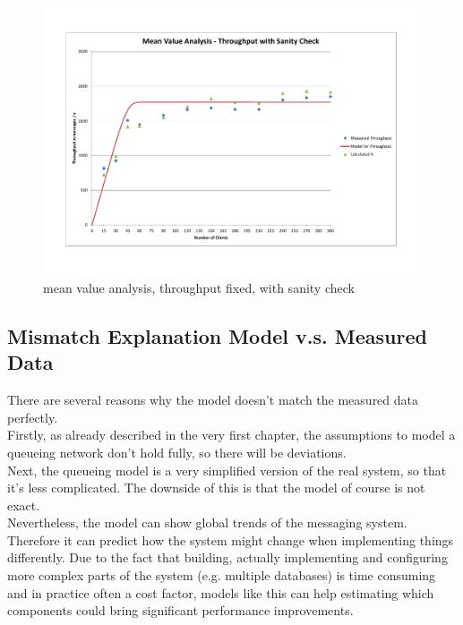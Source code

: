 \documentclass[a4paper]{article}
\begin{document}
{\begin{landscape}\begin{figure}[H]
	\begin{center}
    \includegraphics[scale=0.7, trim = 23mm 28mm 24mm 25mm, clip]{measurements_increase_load/tp_sanity_check_total_fixed.pdf}
  \end{center}
  \caption{mean value analysis, throughput fixed, with sanity check}
  \label{fig:tp-sanity-check-total-fixed}
\end{figure}

\end{landscape}


\subsection{Mismatch Explanation Model v.s. Measured Data}

There are several reasons why the model doesn't match the measured data perfectly.\\

Firstly, as already described in the very first chapter, the assumptions to model a queueing network don't hold fully, so there will be deviations.\\

Next, the queueing model is a very simplified version of the real system, so that it's less complicated. The downside of this is that the model of course is not exact.\\

Nevertheless, the model can show global trends of the messaging system. Therefore it can predict how the system might change when implementing things differently. Due to the fact that building, actually implementing and configuring more complex parts of the system (e.g. multiple databases) is time consuming and in practice often a cost factor, models like this can help estimating which components could bring significant performance improvements.\\


}
\end{document}
